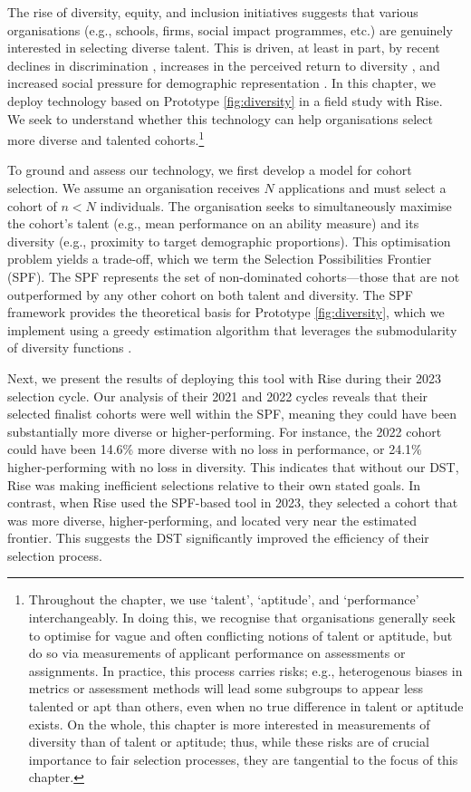 The rise of diversity, equity, and inclusion initiatives suggests that various organisations (e.g., schools, firms, social impact programmes, etc.) are genuinely interested in selecting diverse talent. This is driven, at least in part, by recent declines in discrimination \cite{hsieh2019allocation}, increases in the perceived return to diversity \cite{deming2017growing, page_diversity_2017, noray2023systemic}, and increased social pressure for demographic representation \cite{minkin2023diversity}. In this chapter, we deploy technology based on Prototype \ref{fig:diversity} in a field study with Rise. We seek to understand whether this technology can help organisations select more diverse and talented cohorts.\footnote{Throughout the chapter, we use `talent', `aptitude', and `performance' interchangeably. In doing this, we recognise that organisations generally seek to optimise for vague and often conflicting notions of talent or aptitude, but do so via measurements of applicant performance on assessments or assignments. In practice, this process carries risks; e.g., heterogenous biases in metrics or assessment methods will lead some subgroups to appear less talented or apt than others, even when no true difference in talent or aptitude exists. On the whole, this chapter is more interested in measurements of diversity than of talent or aptitude; thus, while these risks are of crucial importance to fair selection processes, they are tangential to the focus of this chapter.}

To ground and assess our technology, we first develop a model for cohort selection. We assume an organisation receives $N$ applications and must select a cohort of $n<N$ individuals. The organisation seeks to simultaneously maximise the cohort's talent (e.g., mean performance on an ability measure) and its diversity (e.g., proximity to target demographic proportions). This optimisation problem yields a trade-off, which we term the Selection Possibilities Frontier (SPF). The SPF represents the set of non-dominated cohorts—those that are not outperformed by any other cohort on both talent and diversity. The SPF framework provides the theoretical basis for Prototype \ref{fig:diversity}, which we implement using a greedy estimation algorithm that leverages the submodularity of diversity functions \cite{krause2014submodular, huppenkothen2020entrofy}.

Next, we present the results of deploying this tool with Rise during their 2023 selection cycle. Our analysis of their 2021 and 2022 cycles reveals that their selected finalist cohorts were well within the SPF, meaning they could have been substantially more diverse or higher-performing. For instance, the 2022 cohort could have been 14.6\% more diverse with no loss in performance, or 24.1\% higher-performing with no loss in diversity. This indicates that without our DST, Rise was making inefficient selections relative to their own stated goals. In contrast, when Rise used the SPF-based tool in 2023, they selected a cohort that was more diverse, higher-performing, and located very near the estimated frontier. This suggests the DST significantly improved the efficiency of their selection process.

